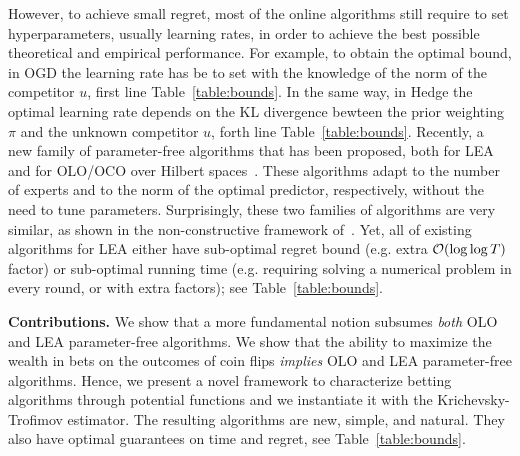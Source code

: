 However, to achieve small regret, most of the online algorithms still require to set
hyperparameters, usually learning rates, in order to
achieve the best possible theoretical and empirical performance. 
For example, to obtain the optimal bound, in \ac{OGD} the learning rate has be to set with the knowledge of the norm of the competitor $u$, first line Table~\ref{table:bounds}. In the same way, in Hedge the optimal learning rate depends on the KL divergence bewteen the prior weighting $\pi$ and the unknown competitor $u$, forth line Table~\ref{table:bounds}.
Recently, a new family of parameter-free algorithms that has been proposed, both for
\ac{LEA}~\cite{Chaudhuri-Freund-Hsu-2009, Chernov-Vovk-2010, Luo-Schapire-2014,
Luo-Schapire-2015, Koolen-van-Erven-2015} and for \ac{OLO}/\ac{OCO} over
Hilbert spaces~\cite{Streeter-McMahan-2012, Orabona-2013,
McMahan-Abernethy-2013, McMahan-Orabona-2014, Orabona-2014}.  These algorithms
adapt to the number of experts and to the norm of the optimal predictor,
respectively, without the need to tune parameters.  Surprisingly, these two
families of algorithms are very similar, as shown in the non-constructive
framework of~\cite{Foster-Rakhlin-Sridharan-2015}.
Yet, all of existing
algorithms for LEA either have sub-optimal regret bound (e.g. extra $\mathcal{O}(\log
\log T)$ factor) or sub-optimal running time (e.g. requiring solving a
numerical problem in every round, or with extra factors); see
Table~\ref{table:bounds}.

\textbf{Contributions.} We show that a more fundamental notion subsumes \emph{both}
\ac{OLO} and \ac{LEA} parameter-free algorithms. We show that the ability to
maximize the wealth in bets on the outcomes of coin flips \emph{implies}
\ac{OLO} and \ac{LEA} parameter-free algorithms.  Hence, we present a novel
framework to characterize betting algorithms through potential functions and we
instantiate it with the Krichevsky-Trofimov estimator.  The resulting
algorithms are new, simple, and natural. They also have optimal guarantees on
time and regret, see Table~\ref{table:bounds}.

